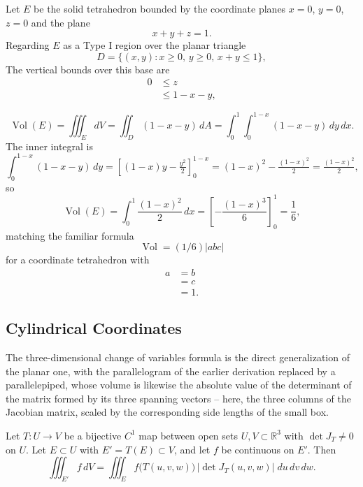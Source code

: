 \begin{example}
Let $E$ be the solid tetrahedron bounded by the coordinate planes $x=0$, $y=0$, $z=0$ and the plane
\[
x+y+z=1.
\] Regarding $E$ as a Type I region over the planar triangle
\[
D = \{(x,y): x\geq0,\,y\geq0,\,x+y\leq1\},
\]
The vertical bounds over this base are
\[
\begin{aligned}
0 &\leq z \\
&\leq 1-x-y,
\end{aligned}
\]

\[
\operatorname{Vol}(E) = \iiint_E dV = \iint_D (1-x-y)\, dA = \int_0^1 \int_0^{1-x} (1-x-y)\, dy\, dx.
\]
The inner integral is
\[
\int_0^{1-x}(1-x-y)\,dy = \left[(1-x)y - \tfrac{y^2}{2}\right]_0^{1-x} = (1-x)^2 - \tfrac{(1-x)^2}{2} = \tfrac{(1-x)^2}{2},
\]
so
\[
\operatorname{Vol}(E) = \int_0^1 \frac{(1-x)^2}{2}\, dx = \left[-\frac{(1-x)^3}{6}\right]_0^1 = \frac{1}{6},
\]
matching the familiar formula
\[
\operatorname{Vol} = (1/6)|abc|
\]
for a coordinate tetrahedron with
\[
\begin{aligned}
a &= b \\
&= c \\
&= 1.
\end{aligned}
\]

\end{example}

\subsection{Cylindrical Coordinates}


The three-dimensional change of variables formula is the direct generalization of the planar one, with the parallelogram of the earlier derivation replaced by a parallelepiped, whose volume is likewise the absolute value of the determinant of the matrix formed by its three spanning vectors -- here, the three columns of the Jacobian matrix, scaled by the corresponding side lengths of the small box.

\begin{theorem}
Let $T : U \to V$ be a bijective $C^1$ map between open sets $U,V \subset \mathbb{R}^3$ with $\det J_T \neq 0$ on $U$. Let $E \subset U$ with $E' = T(E) \subset V$, and let $f$ be continuous on $E'$. Then
\[
\iiint_{E'} f\, dV = \iiint_E f\big(T(u,v,w)\big)\, |\det J_T(u,v,w)| \; du\, dv\, dw.
\]

\end{theorem}

